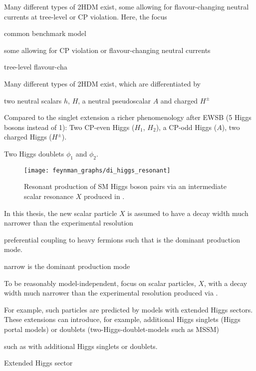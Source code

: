 \begin{description}
  Many different types of 2HDM exist, some allowing for flavour-changing neutral
  currents at tree-level or CP violation. Here, the focus

  common benchmark model

  some allowing for CP violation or
  flavour-changing neutral currents

  tree-level flavour-cha

  Many different types of 2HDM exist, which are differentiated by

  two neutral scalars $h$, $H$,
  a neutral pseudoscalar $A$
  and charged $H^\pm$

  Compared to the singlet extension a richer phenomenology after EWSB (5 Higgs
  bosons instead of 1): Two CP-even Higgs ($H_1$, $H_2$), a CP-odd Higgs ($A$),
  two charged Higgs ($H^\pm$).

  Two Higgs doublets $\phi_1$ and $\phi_2$.
  \cite{Djouadi:2013vqa,Djouadi:2013uqa}

\end{description}


\begin{figure}[htbp]
  \centering

  \texttt{[image: feynman\_graphs/di\_higgs\_resonant]}

  \caption{Resonant production of SM Higgs boson pairs via an intermediate
    scalar resonance $X$ produced in \ggF.}%
  \label{fig:resonant_production_feyn}
\end{figure}

In this thesis, the new scalar particle $X$ is assumed to have a decay width
much narrower than the experimental resolution

preferential coupling to heavy fermions such that \ggF is the dominant
production mode.


narrow \ggF is the dominant production mode

To be reasonably model-independent, focus on scalar particles, $X$, with a decay
width much narrower than the experimental resolution produced via \ggF.

For example, such particles are predicted by models with extended Higgs
sectors. These extensions can introduce, for example, additional Higgs singlets
(Higgs portal models) or doublets (two-Higgs-doublet-models such as MSSM)

such as with additional Higgs singlets or doublets.

Extended Higgs sector




